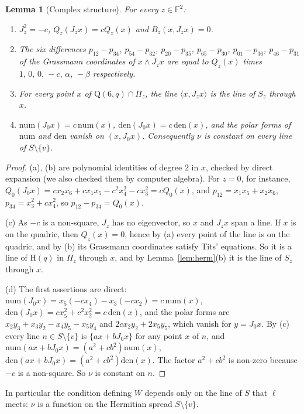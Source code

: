 \documentclass[11pt]{amsart}
\newtheorem{lemma}[theorem]{Lemma}
\theoremstyle{definition}
\theoremstyle{remark}
\newcommand{\F}{\mathbb{F}}
\newcommand{\Hq}{\mathrm{H}}
\newcommand{\Qf}{\mathrm{Q}}
\begin{document}
\begin{lemma}[Complex structure]\label{lem:J}
For every $z\in\F^2$:
\begin{enumerate}[label=\textup{(\alph*)}]
\item $J_z^2=-c$, $Q_z(J_zx)=cQ_z(x)$ and $B_z(x,J_zx)=0$.
\item The six differences $p_{12}-p_{34}$, $p_{54}-p_{32}$, $p_{20}-p_{35}$, $p_{65}-p_{30}$, $p_{01}-p_{36}$, $p_{46}-p_{31}$ of the Grassmann coordinates of $x\wedge J_zx$ are equal to $Q_z(x)$ times $1,\,0,\,0,\,-c,\,\alpha,\,-\beta$ respectively.
\item For every point $x$ of $\Qf(6,q)\cap\Pi_z$, the line $\langle x,J_zx\rangle$ is the line of $S_z$ through $x$.
\item $\mathrm{num}(J_0x)=c\,\mathrm{num}(x)$, $\mathrm{den}(J_0x)=c\,\mathrm{den}(x)$, and the polar forms of $\mathrm{num}$ and $\mathrm{den}$ vanish on $(x,J_0x)$. Consequently $\nu$ is constant on every line of $S\setminus\{v\}$.
\end{enumerate}
\end{lemma}

\begin{proof}
(a), (b) are polynomial identities of degree $2$ in $x$, checked by direct expansion (we also checked them by computer algebra). For $z=0$, for instance, $Q_0(J_0x)=cx_2x_6+cx_1x_5-c^2x_4^2-cx_3^2=cQ_0(x)$, and $p_{12}=x_1x_5+x_2x_6$, $p_{34}=x_3^2+cx_4^2$, so $p_{12}-p_{34}=Q_0(x)$.

(c) As $-c$ is a non-square, $J_z$ has no eigenvector, so $x$ and $J_zx$ span a line. If $x$ is on the quadric, then $Q_z(x)=0$, hence by (a) every point of the line is on the quadric, and by (b) its Grassmann coordinates satisfy Tits' equations. So it is a line of $\Hq(q)$ in $\Pi_z$ through $x$, and by Lemma~\ref{lem:herm}(b) it is the line of $S_z$ through $x$.

(d) The first assertions are direct: $\mathrm{num}(J_0x)=x_5(-cx_4)-x_3(-cx_2)=c\,\mathrm{num}(x)$, $\mathrm{den}(J_0x)=cx_5^2+c^2x_2^2=c\,\mathrm{den}(x)$, and the polar forms are $x_2y_3+x_3y_2-x_4y_5-x_5y_4$ and $2cx_2y_2+2x_5y_5$, which vanish for $y=J_0x$. By (c) every line $n\in S\setminus\{v\}$ is $\{ax+bJ_0x\}$ for any point $x$ of $n$, and $\mathrm{num}(ax+bJ_0x)=(a^2+cb^2)\mathrm{num}(x)$, $\mathrm{den}(ax+bJ_0x)=(a^2+cb^2)\mathrm{den}(x)$. The factor $a^2+cb^2$ is non-zero because $-c$ is a non-square. So $\nu$ is constant on $n$.
\end{proof}

In particular the condition defining $W$ depends only on the line of $S$ that $\ell$ meets: $\nu$ is a function on the Hermitian spread $S\setminus\{v\}$.
\end{document}
